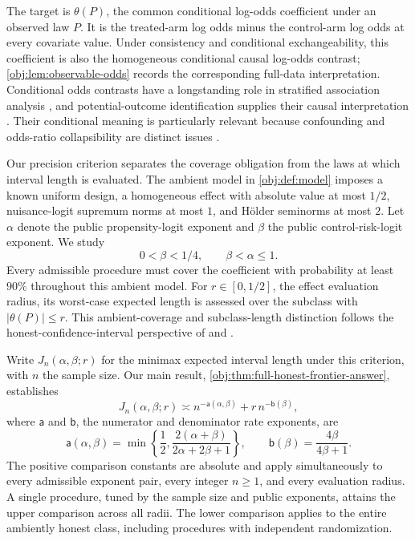 The target is \(\theta(P)\), the common conditional log-odds coefficient under an observed law \(P\). It is the treated-arm log odds minus the control-arm log odds at every covariate value. Under consistency and conditional exchangeability, this coefficient is also the homogeneous conditional causal log-odds contrast; \cref{obj:lem:observable-odds} records the corresponding full-data interpretation. Conditional odds contrasts have a longstanding role in stratified association analysis \citep{Mantel1959}, and potential-outcome identification supplies their causal interpretation \citep{Rubin1974,Rosenbaum1983}. Their conditional meaning is particularly relevant because confounding and odds-ratio collapsibility are distinct issues \citep{Greenland1999}.

Our precision criterion separates the coverage obligation from the laws at which interval length is evaluated. The ambient model in \cref{obj:def:model} imposes a known uniform design, a homogeneous effect with absolute value at most \(1/2\), nuisance-logit supremum norms at most \(1\), and Hölder seminorms at most \(2\). Let \(\alpha\) denote the public propensity-logit exponent and \(\beta\) the public control-risk-logit exponent. We study
\[
0<\beta<1/4,\qquad \beta<\alpha\le1.
\]
Every admissible procedure must cover the coefficient with probability at least \(90\%\) throughout this ambient model. For \(r\in[0,1/2]\), the effect evaluation radius, its worst-case expected length is assessed over the subclass with \(|\theta(P)|\le r\). This ambient-coverage and subclass-length distinction follows the honest-confidence-interval perspective of \citet{Low1997} and \citet[Section 2, Theorem 1]{CaiLow2004ConfidenceAdaptation}.

Write \(J_n(\alpha,\beta;r)\) for the minimax expected interval length under this criterion, with \(n\) the sample size. Our main result, \cref{obj:thm:full-honest-frontier-answer}, establishes
\[
J_n(\alpha,\beta;r)
\asymp
n^{-\mathsf a(\alpha,\beta)}
+r\,n^{-\mathsf b(\beta)},
\]
where \(\mathsf a\) and \(\mathsf b\), the numerator and denominator rate exponents, are
\[
\mathsf a(\alpha,\beta)
=\min\left\{\frac12,\frac{2(\alpha+\beta)}{2\alpha+2\beta+1}\right\},
\qquad
\mathsf b(\beta)=\frac{4\beta}{4\beta+1}.
\]
The positive comparison constants are absolute and apply simultaneously to every admissible exponent pair, every integer \(n\ge1\), and every evaluation radius. A single procedure, tuned by the sample size and public exponents, attains the upper comparison across all radii. The lower comparison applies to the entire ambiently honest class, including procedures with independent randomization.

